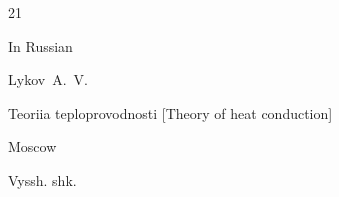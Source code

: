 \begin{thebibliography}{21}

\lang In Russian

\by Lykov~A.~V.

\book Teoriia teploprovodnosti \rm [Theory of heat conduction]

\publaddr Moscow

\publ Vyssh. shk.











\end{thebibliography}



\EngDate



\renewcommand{\baselinestretch}{0.9}

\Russian

\newpage





%

